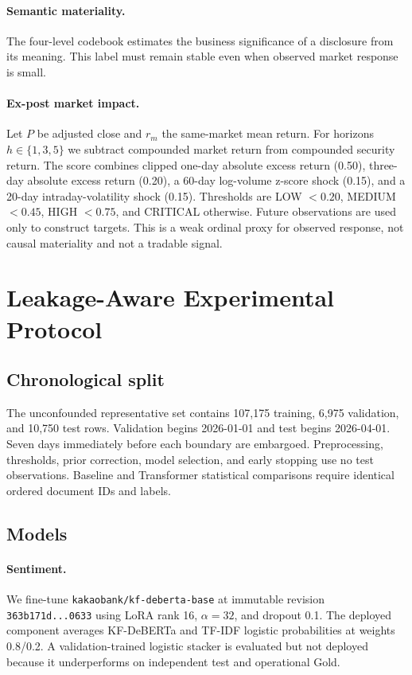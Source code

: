 \documentclass[11pt]{article}
\begin{document}
\paragraph{Semantic materiality.}
The four-level codebook estimates the business significance of a disclosure from its meaning. This label must remain stable even when observed market response is small.

\paragraph{Ex-post market impact.}
Let $P$ be adjusted close and $r_m$ the same-market mean return. For horizons $h\in\{1,3,5\}$ we subtract compounded market return from compounded security return. The score combines clipped one-day absolute excess return (0.50), three-day absolute excess return (0.20), a 60-day log-volume z-score shock (0.15), and a 20-day intraday-volatility shock (0.15). Thresholds are LOW $<0.20$, MEDIUM $<0.45$, HIGH $<0.75$, and CRITICAL otherwise. Future observations are used only to construct targets. This is a weak ordinal proxy for observed response, not causal materiality and not a tradable signal.

\section{Leakage-Aware Experimental Protocol}

\subsection{Chronological split}

The unconfounded representative set contains 107,175 training, 6,975 validation, and 10,750 test rows. Validation begins 2026-01-01 and test begins 2026-04-01. Seven days immediately before each boundary are embargoed. Preprocessing, thresholds, prior correction, model selection, and early stopping use no test observations. Baseline and Transformer statistical comparisons require identical ordered document IDs and labels.

\subsection{Models}

\paragraph{Sentiment.}
We fine-tune \texttt{kakaobank/kf-deberta-base} at immutable revision \texttt{363b171d...0633} using LoRA rank 16, $\alpha=32$, and dropout 0.1. The deployed component averages KF-DeBERTa and TF-IDF logistic probabilities at weights 0.8/0.2. A validation-trained logistic stacker is evaluated but not deployed because it underperforms on independent test and operational Gold.
\end{document}
